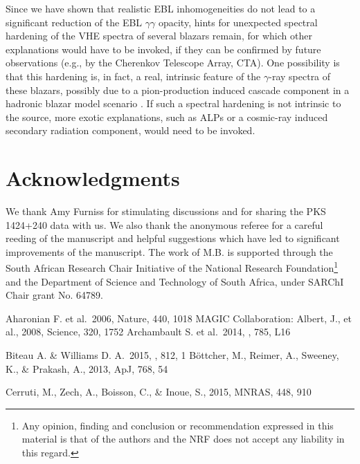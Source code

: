 \documentclass{aastex6}
\begin{document}
{Since we have shown that realistic EBL inhomogeneities do not lead to a significant reduction 
of the EBL $\gamma\gamma$ opacity, hints for unexpected spectral hardening of the VHE spectra of 
several blazars remain, for which other explanations would have to be invoked, if they can be 
confirmed by future observations (e.g., by the Cherenkov Telescope Array, CTA).
One possibility is that this hardening
is, in fact, a real, intrinsic feature of the $\gamma$-ray spectra of these blazars, possibly
due to a pion-production induced cascade component in a hadronic blazar model scenario 
\citep[e.g.,][]{Boettcher13,Cerruti15}. If such a spectral hardening is not intrinsic
to the source, more exotic explanations, such as ALPs or a cosmic-ray induced secondary
radiation component, would need to be invoked. 


\section{Acknowledgments}

We thank Amy Furniss for stimulating discussions and for sharing the PKS 1424+240 data with us. 
We also thank the anonymous referee for a careful reeding of the manuscript and helpful 
suggestions which have led to significant improvements of the manuscript.
The work of M.B. is supported through the South African Research Chair Initiative of the National 
Research Foundation\footnote{Any opinion, finding and conclusion or recommendation expressed in 
this material is that of the authors and the NRF does not accept any liability in this regard.} 
and the Department of Science and Technology of South Africa, under SARChI Chair grant No. 64789. 



\begin{thebibliography}{}

 Aharonian F.  et al.\ 2006, Nature, 440, 1018
 MAGIC Collaboration: Albert, J., et al., 2008, Science, 320, 1752
 Archambault S. et al.\ 2014, \apj, 785, L16

 Biteau A. \& Williams D. A.\ 2015, \apj, 812, 1
 B\"ottcher, M., Reimer, A., Sweeney, K., \& Prakash, A., 2013, ApJ, 768, 54

 Cerruti, M., Zech, A., Boisson, C., \& Inoue, S., 2015, MNRAS, 448, 910


\end{thebibliography}}
\end{document}

